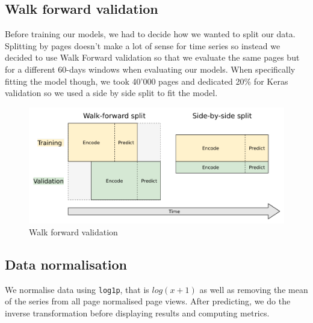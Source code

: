 \documentclass[11pt]{article}
\begin{document}
    \subsection{Walk forward validation}
    Before training our models, we had to decide how we wanted to split our data. Splitting by pages doesn't make a lot of sense for time series so instead we decided to use Walk Forward validation so that we evaluate the same pages but for a different 60-days windows when evaluating our models. When specifically fitting the model though, we took 40'000 pages and dedicated 20\% for Keras validation so we used a side by side split to fit the model.
    \begin{figure}[H]
        \centering
        \includegraphics[width=.7\textwidth]{walkforward.png}
        \caption{Walk forward validation}
    \end{figure}
    \subsection{Data normalisation}
    We normalise data using \verb+log1p+, that is $log(x+1)$ as well as removing the mean of the series from all page normalised page views. After predicting, we do the inverse transformation before displaying results and computing metrics.
\end{document}
